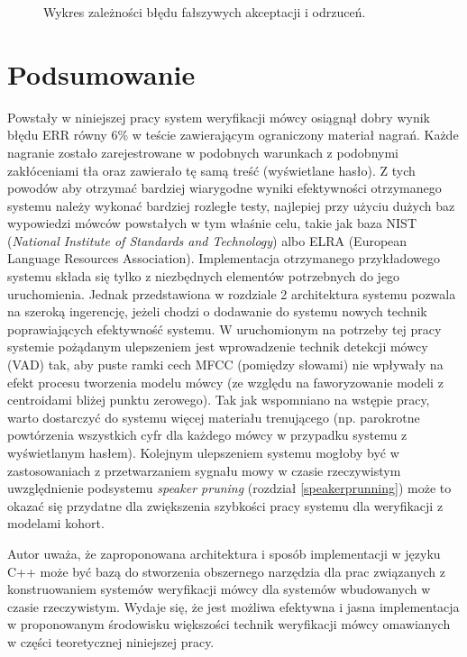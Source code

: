 \begin{figure}[!h]
  \centering
    
    \caption{\label{fig:err} Wykres zależności błędu fałszywych akceptacji i odrzuceń.}
\end{figure}

\section{Podsumowanie}

Powstały w niniejszej pracy system weryfikacji mówcy osiągnął dobry wynik błędu ERR równy 6\% w teście zawierającym ograniczony materiał nagrań. Każde nagranie zostało zarejestrowane w podobnych warunkach z podobnymi zakłóceniami tła oraz zawierało tę samą treść (wyświetlane hasło). Z tych powodów aby otrzymać bardziej wiarygodne wyniki efektywności otrzymanego systemu należy wykonać bardziej rozległe testy, najlepiej przy użyciu dużych baz wypowiedzi mówców powstałych w tym
właśnie celu, takie jak baza NIST (\textit{National Institute of Standards and Technology}) albo ELRA (European Language Resources Association). Implementacja otrzymanego przykładowego systemu składa się tylko z niezbędnych elementów potrzebnych do jego uruchomienia. Jednak przedstawiona w rozdziale 2 architektura systemu pozwala na szeroką ingerencję, jeżeli chodzi o dodawanie do systemu nowych technik poprawiających efektywność systemu. W uruchomionym na potrzeby tej pracy
systemie pożądanym ulepszeniem jest wprowadzenie technik detekcji mówcy (VAD) tak, aby puste ramki cech MFCC (pomiędzy słowami) nie wpływały na efekt procesu tworzenia modelu mówcy (ze względu na faworyzowanie modeli z centroidami bliżej punktu zerowego). Tak jak wspomniano na wstępie pracy, warto dostarczyć do systemu więcej materiału trenującego (np. parokrotne powtórzenia wszystkich cyfr dla każdego mówcy w przypadku systemu z wyświetlanym hasłem). Kolejnym ulepszeniem systemu
mogłoby być w zastosowaniach z przetwarzaniem sygnału mowy w czasie rzeczywistym uwzględnienie podsystemu \textit{speaker pruning} (rozdział {\ref{speakerprunning}}) może to okazać się przydatne dla zwiększenia szybkości pracy systemu dla weryfikacji z modelami kohort.

Autor uważa, że zaproponowana architektura i sposób implementacji w języku C++ może być bazą do stworzenia obszernego narzędzia dla prac związanych z konstruowaniem systemów weryfikacji mówcy dla systemów wbudowanych w czasie rzeczywistym. Wydaje się, że jest możliwa efektywna i jasna implementacja w proponowanym środowisku większości technik weryfikacji mówcy omawianych w części teoretycznej niniejszej pracy.
